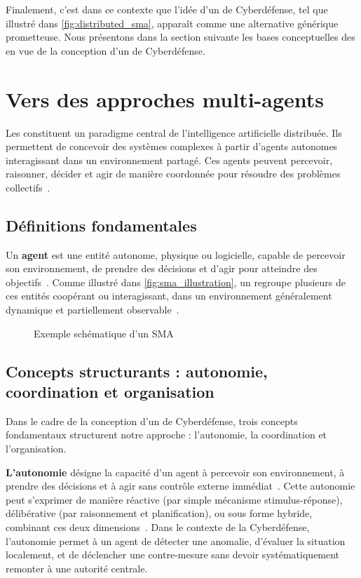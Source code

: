 \noindent
Finalement, c'est dans ce contexte que l'idée d'un  de Cyberdéfense, tel que illustré dans \autoref{fig:distributed_sma}, apparaît comme une alternative générique prometteuse. Nous présentons dans la section suivante les bases conceptuelles des  en vue de la conception d'un  de Cyberdéfense.

\section{Vers des approches multi-agents}\label{sec:sma-concepts}

Les  constituent un paradigme central de l'intelligence artificielle distribuée. Ils permettent de concevoir des systèmes complexes à partir d'agents autonomes interagissant dans un environnement partagé. Ces agents peuvent percevoir, raisonner, décider et agir de manière coordonnée pour résoudre des problèmes collectifs~\cite{Ferber1999,Wooldridge2002}.

\subsection*{Définitions fondamentales}

Un \textbf{agent} est une entité autonome, physique ou logicielle, capable de percevoir son environnement, de prendre des décisions et d'agir pour atteindre des objectifs~\cite{Russell2010}. Comme illustré dans \autoref{fig:sma_illustration}, un  regroupe plusieurs de ces entités coopérant ou interagissant, dans un environnement généralement dynamique et partiellement observable~\cite{Jennings1998,Shoham2007}.

\begin{figure}[h]
    \centering
    \resizebox{\textwidth}{!}{%
        
    }
    \caption{Exemple schématique d'un SMA}
    \label{fig:sma_illustration}
\end{figure}

\subsection*{Concepts structurants : autonomie, coordination et organisation}

Dans le cadre de la conception d'un  de Cyberdéfense, trois concepts fondamentaux structurent notre approche : l'autonomie, la coordination et l'organisation.

\textbf{L'autonomie} désigne la capacité d'un agent à percevoir son environnement, à prendre des décisions et à agir sans contrôle externe immédiat~\cite{Russell2010}. Cette autonomie peut s'exprimer de manière réactive (par simple mécanisme stimulus-réponse), délibérative (par raisonnement et planification), ou sous forme hybride, combinant ces deux dimensions~\cite{Georgeff1987}. Dans le contexte de la Cyberdéfense, l'autonomie permet à un agent de détecter une anomalie, d'évaluer la situation localement, et de déclencher une contre-mesure sans devoir systématiquement remonter à une autorité centrale.

